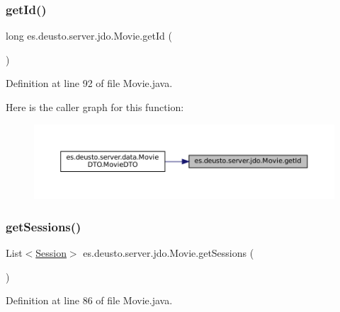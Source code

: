 \subsubsection{\texorpdfstring{getId()}{getId()}}
{\footnotesize\ttfamily long es.\+deusto.\+server.\+jdo.\+Movie.\+get\+Id (\begin{DoxyParamCaption}{ }\end{DoxyParamCaption})}



Definition at line 92 of file Movie.\+java.

Here is the caller graph for this function\+:\nopagebreak
\begin{figure}[H]
\begin{center}
\leavevmode
\includegraphics[width=350pt]{classes_1_1deusto_1_1server_1_1jdo_1_1_movie_a4d2758ed2b7a03bd95646f67c046e043_icgraph}
\end{center}
\end{figure}
\mbox{\label{classes_1_1deusto_1_1server_1_1jdo_1_1_movie_a8d94f72339ed5601515e139de313e181}} 
\subsubsection{\texorpdfstring{getSessions()}{getSessions()}}
{\footnotesize\ttfamily List$<$\mbox{\hyperlink{classes_1_1deusto_1_1server_1_1jdo_1_1_session}{Session}}$>$ es.\+deusto.\+server.\+jdo.\+Movie.\+get\+Sessions (\begin{DoxyParamCaption}{ }\end{DoxyParamCaption})}



Definition at line 86 of file Movie.\+java.

